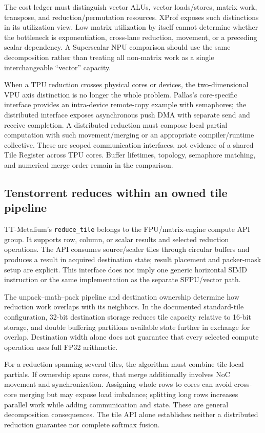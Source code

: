 The cost ledger must distinguish vector ALUs, vector loads/stores, matrix work, transpose, and reduction/permutation resources. XProf exposes such distinctions in its utilization view. Low matrix utilization by itself cannot determine whether the bottleneck is exponentiation, cross-lane reduction, movement, or a preceding scalar dependency. A Superscalar NPU comparison should use the same decomposition rather than treating all non-matrix work as a single interchangeable ``vector'' capacity.~\citep{u005-xprof}

When a TPU reduction crosses physical cores or devices, the two-dimensional VPU axis distinction is no longer the whole problem. Pallas's core-specific interface provides an intra-device remote-copy example with semaphores; the distributed interface exposes asynchronous push DMA with separate send and receive completion. A distributed reduction must compose local partial computation with such movement/merging or an appropriate compiler/runtime collective. These are scoped communication interfaces, not evidence of a shared Tile Register across TPU cores. Buffer lifetimes, topology, semaphore matching, and numerical merge order remain in the comparison.~\citep{u006-pallas-coremap,u006-pallas-distributed}

\subsection{Tenstorrent reduces within an owned tile pipeline}

TT-Metalium's \texttt{reduce\_tile} belongs to the FPU/matrix-engine compute API group. It supports row, column, or scalar results and selected reduction operations. The API consumes source/scaler tiles through circular buffers and produces a result in acquired destination state; result placement and packer-mask setup are explicit. This interface does not imply one generic horizontal SIMD instruction or the same implementation as the separate SFPU/vector path.~\citep{u005-tt-reduce}

The unpack--math--pack pipeline and destination ownership determine how reduction work overlaps with its neighbors. In the documented standard-tile configuration, 32-bit destination storage reduces tile capacity relative to 16-bit storage, and double buffering partitions available state further in exchange for overlap. Destination width alone does not guarantee that every selected compute operation uses full FP32 arithmetic.~\citep{u005-tt-engines}

For a reduction spanning several tiles, the algorithm must combine tile-local partials. If ownership spans cores, that merge additionally involves NoC movement and synchronization. Assigning whole rows to cores can avoid cross-core merging but may expose load imbalance; splitting long rows increases parallel work while adding communication and state. These are general decomposition consequences. The tile API alone establishes neither a distributed reduction guarantee nor complete softmax fusion.

